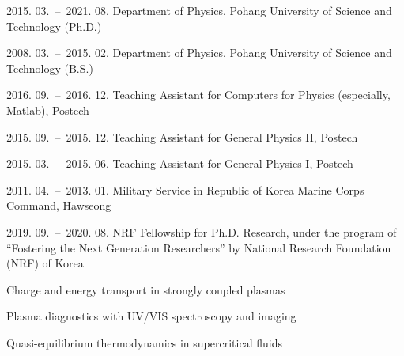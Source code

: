 
\begin{personaldata}
\end{personaldata}

\begin{education}
	\item[2015. 03.\ --\ 2021. 08.] Department of Physics, Pohang University of Science and Technology (Ph.D.)
	\item[2008. 03.\ --\ 2015. 02.] Department of Physics, Pohang University of Science and Technology (B.S.)
\end{education}

\begin{experience}
	\item[2016. 09.\ --\ 2016. 12.] Teaching Assistant for Computers for Physics (especially, Matlab), Postech
	\item[2015. 09.\ --\ 2015. 12.] Teaching Assistant for General Physics II, Postech
	\item[2015. 03.\ --\ 2015. 06.] Teaching Assistant for General Physics I, Postech
	\item[2011. 04.\ --\ 2013. 01.] Military Service in Republic of Korea Marine Corps Command, Hawseong
\end{experience}

\begin{fellowship}
	\item[2019. 09.\ --\ 2020. 08.] NRF Fellowship for Ph.D. Research, under the program of “Fostering the Next Generation Researchers” by National Research Foundation (NRF) of Korea
\end{fellowship}

\begin{interest}
    \item Charge and energy transport in strongly coupled plasmas
    \item Plasma diagnostics with UV/VIS spectroscopy and imaging
    \item Quasi-equilibrium thermodynamics in supercritical fluids
\end{interest}

